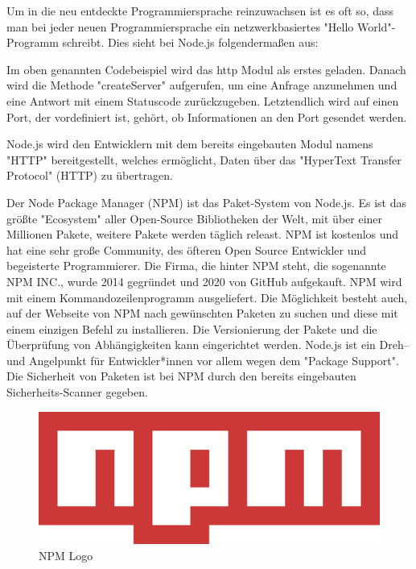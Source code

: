 
Um in die neu entdeckte Programmiersprache reinzuwachsen ist es oft so, dass man bei jeder neuen Programmiersprache ein netzwerkbasiertes "Hello World"-Programm schreibt. Dies sieht bei Node.js folgendermaßen aus:


Im oben genannten Codebeispiel wird das http Modul als erstes geladen. Danach wird die Methode "createServer" aufgerufen, um eine Anfrage anzunehmen und eine Antwort mit einem Statuscode zurückzugeben. Letztendlich wird auf einen Port, der vordefiniert ist, gehört, ob Informationen an den Port gesendet werden.

Node.js wird den Entwicklern mit dem bereits eingebauten Modul namens "HTTP" bereitgestellt, welches ermöglicht, Daten über das "HyperText Transfer Protocol" (HTTP) zu übertragen. \cite{HelloWorld}

\label{sec:npm}

Der Node Package Manager (NPM) ist das Paket-System von Node.js. Es ist das größte "Ecosystem" aller Open-Source Bibliotheken der Welt, mit über einer Millionen Pakete, weitere Pakete werden täglich releast. NPM ist kostenlos und hat eine sehr große Community, des öfteren Open Source Entwickler und begeisterte Programmierer. Die Firma, die hinter NPM steht, die sogenannte NPM INC., wurde 2014 gegründet und 2020 von GitHub aufgekauft.
NPM wird mit einem Kommandozeilenprogramm ausgeliefert. Die Möglichkeit besteht auch, auf der Webseite von NPM nach gewünschten Paketen zu suchen und diese mit einem einzigen Befehl zu installieren. Die Versionierung der Pakete und die Überprüfung von Abhängigkeiten kann eingerichtet werden. Node.js ist ein Dreh– und Angelpunkt für Entwickler*innen vor allem wegen dem "Package Support".
Die Sicherheit von Paketen ist bei NPM durch den bereits eingebauten Sicherheits-Scanner gegeben.\cite{NPM} \cite{NPM2}

\begin{figure}[H]
    \centering
    \includegraphics{media/NodeJs/NPM.png}
    \caption{NPM Logo\cite{NPMLOGO}}
\end{figure}


